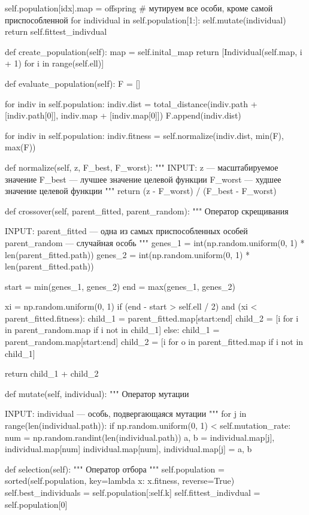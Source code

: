 \begin{pyprint}
          self.population[idx].map = offspring
       # мутируем все особи, кроме самой приспособленной
       for individual in self.population[1:]:
          self.mutate(individual)
    return self.fittest_indivdual

  def create_population(self):
    map = self.inital_map
    return [Individual(self.map, i + 1) for i in range(self.ell)]

  def evaluate_population(self):
    F = []

    for indiv in self.population:
       indiv.dist = total_distance(indiv.path + [indiv.path[0]],
                                   indiv.map + [indiv.map[0]])
       F.append(indiv.dist)

    for indiv in self.population:
       indiv.fitness = self.normalize(indiv.dist,
                                      min(F), max(F))

  def normalize(self, z, F_best, F_worst):
    """
    INPUT:
    z --- масштабируемое значение
    F_best --- лучшее значение целевой функции
    F_worst --- худшее значение целевой функции
    """
    return (z - F_worst) / (F_best - F_worst)

  def crossover(self, parent_fitted, parent_random):
    """
    Оператор скрещивания

    INPUT:
    parent_fitted --- одна из самых приспособленных особей
    parent_random --- случайная особь
    """
    genes_1 = int(np.random.uniform(0, 1) * len(parent_fitted.path))
    genes_2 = int(np.random.uniform(0, 1) * len(parent_fitted.path))

    start = min(genes_1, genes_2)
    end = max(genes_1, genes_2)
\end{pyprint}

\begin{pyprint}
    xi = np.random.uniform(0, 1)
    if (end - start > self.ell / 2) and (xi < parent_fitted.fitness):
       child_1 = parent_fitted.map[start:end]
       child_2 = [i for i in parent_random.map if i not in child_1]
    else:
       child_1 = parent_random.map[start:end]
       child_2 = [i for o in parent_fitted.map if i not in child_1]

    return child_1 + child_2

  def mutate(self, individual):
    """
    Оператор мутации

    INPUT:
    individual --- особь, подвергающаяся мутации
    """
    for j in range(len(individual.path)):
       if np.random.uniform(0, 1) < self.mutation_rate:
          num = np.random.randint(len(individual.path))
          a, b = individual.map[j], individual.map[num]
          individual.map[num], individual.map[j] = a, b

  def selection(self):
    """
    Оператор отбора
    """
    self.population = sorted(self.population,
                             key=lambda x: x.fitness, reverse=True)
    self.best_individuals = self.population[:self.k]
    self.fittest_indivdual = self.population[0]
\end{pyprint}

